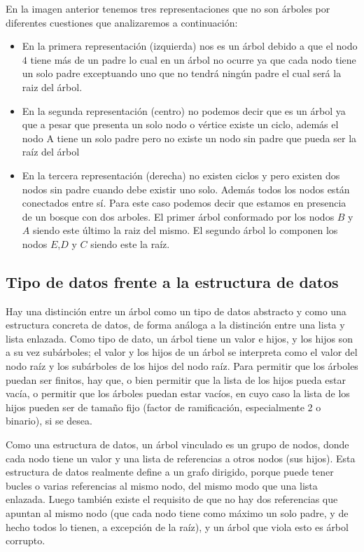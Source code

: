 En la imagen anterior tenemos tres representaciones que no son árboles por diferentes cuestiones que analizaremos a continuación:

\begin{itemize}
	\item En la primera representación (izquierda) nos es un árbol debido a que el nodo $4$ tiene más de un padre lo cual en un árbol no ocurre ya que cada nodo tiene un solo padre exceptuando uno que no tendrá ningún padre el cual será la raiz del árbol.
	\item En la segunda representación (centro) no podemos decir que es un árbol ya que a pesar que presenta un solo nodo o vértice existe un ciclo, además el nodo A tiene un solo padre pero no existe un nodo sin padre que pueda ser la raíz del árbol 
	\item En la tercera representación (derecha) no existen ciclos y pero existen dos nodos sin padre cuando debe existir uno solo. Además todos los nodos están conectados entre sí. Para este caso podemos decir que estamos en presencia de un bosque con dos arboles. El primer árbol conformado por los nodos $B$ y $A$ siendo este último la raiz del mismo. El segundo árbol lo componen los nodos $E$,$D$ y $C$ siendo este la raíz.
\end{itemize}

\subsection{Tipo de datos frente a la estructura de datos} 

Hay una distinción entre un árbol como un tipo de datos abstracto y como una estructura concreta de datos, de forma análoga a la distinción entre una lista y lista enlazada. Como tipo de dato, un árbol tiene un valor e hijos, y los hijos son a su vez subárboles; el valor y los hijos de un árbol se interpreta como el valor del nodo raíz y los subárboles de los hijos del nodo raíz. Para permitir que los árboles puedan ser finitos, hay que, o bien permitir que la lista de los hijos pueda estar vacía, o permitir que los árboles puedan estar vacíos, en cuyo caso la lista de los hijos pueden ser de tamaño fijo (factor de ramificación, especialmente 2 o binario), si se desea.

Como una estructura de datos, un árbol vinculado es un grupo de nodos, donde cada 
nodo tiene un valor y una lista de referencias a otros nodos (sus hijos). Esta 
estructura de datos realmente define a un grafo dirigido, porque puede tener bucles 
o varias referencias al mismo nodo, del mismo modo que una lista enlazada. Luego 
también existe el requisito de que no hay dos referencias que apuntan al mismo nodo 
(que cada nodo tiene como máximo un solo padre, y de hecho todos lo tienen, a 
excepción de la raíz), y un árbol que viola esto es árbol corrupto.

